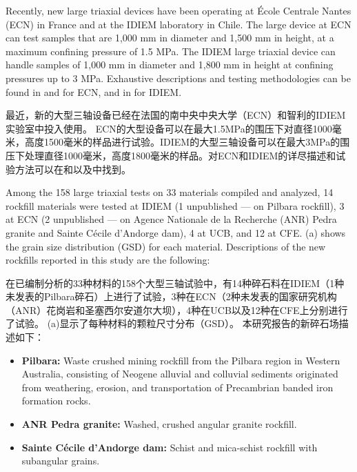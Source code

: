\begin{ParaColumn}
    
    Recently, new large triaxial devices have been operating at École Centrale Nantes (ECN) in France and at the IDIEM laboratory in Chile. The large device at ECN can test samples that are 1,000 mm in diameter and 1,500 mm in height, at a maximum confining pressure of 1.5 MPa. The IDIEM large triaxial device can handle samples of 1,000 mm in diameter and 1,800 mm in height at confining pressures up to 3 MPa. Exhaustive descriptions and testing methodologies can be found in \citet{Hu2011} and \citet{Ovalle2013} for ECN, and in \citet{DelaHozAlvarez2007} for IDIEM.

    \switchcolumn

    最近，新的大型三轴设备已经在法国的南中央中央大学（ECN）和智利的IDIEM实验室中投入使用。 ECN的大型设备可以在最大1.5MPa的围压下对直径1000毫米，高度1500毫米的样品进行试验。IDIEM的大型三轴设备可以在最大3MPa的围压下处理直径1000毫米，高度1800毫米的样品。对ECN和IDIEM的详尽描述和试验方法可以在\citet{Hu2011}和\citet{Ovalle2013}以及\citet{DelaHozAlvarez2007}中找到。

    \CrossColumnText{
        
    }

    \switchcolumn*

    Among the 158 large triaxial tests on 33 materials compiled and analyzed, 14 rockfill materials were tested at IDIEM (1 unpublished — on Pilbara rockfill), 3 at ECN (2 unpublished — on Agence Nationale de la Recherche (ANR) Pedra granite and Sainte Cécile d’Andorge dam), 4 at UCB, and 12 at CFE. (a) shows the grain size distribution (GSD) for each material. Descriptions of the new rockfills reported in this study are the following:

    \switchcolumn

    在已编制分析的33种材料的158个大型三轴试验中，有14种碎石料在IDIEM（1种未发表的Pilbara碎石）上进行了试验，3种在ECN（2种未发表的国家研究机构（ANR）花岗岩和圣塞西尔安道尔大坝），4种在UCB以及12种在CFE上分别进行了试验。 (a)显示了每种材料的颗粒尺寸分布（GSD）。 本研究报告的新碎石场描述如下：

    \switchcolumn*

    \begin{itemize}
        \item \textbf{Pilbara:} Waste crushed mining rockfill from the Pilbara region in Western Australia, consisting of Neogene alluvial and colluvial sediments originated from weathering, erosion, and transportation of Precambrian banded iron formation rocks.
        \item \textbf{ANR Pedra granite:} Washed, crushed angular granite rockfill.\\[-5mm]
        \item \textbf{Sainte Cécile d’Andorge dam:} Schist and mica-schist rockfill with subangular grains.
    \end{itemize}


\end{ParaColumn}
